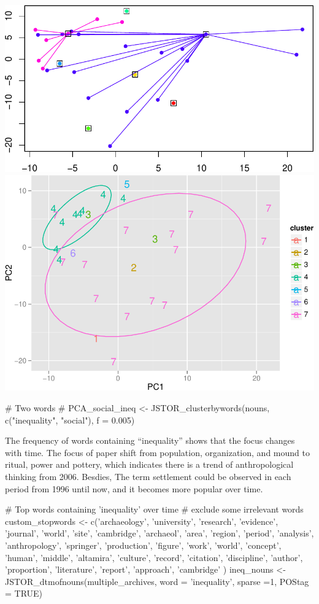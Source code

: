 \documentclass[10pt]{article}
\newenvironment{CodeChunk}{}{}
\begin{document}
\begin{CodeChunk}
\begin{CodeChunk}
\includegraphics{509Assignment_files/figure-latex/onegram3-27} 
\includegraphics{509Assignment_files/figure-latex/onegram3-28} \begin{CodeInput}
# Two words
# PCA_social_ineq <- JSTOR_clusterbywords(nouns, c("inequality", "social"), f = 0.005)
\end{CodeInput}
\end{CodeChunk}

The frequency of words containing ``inequality'' shows that the focus
changes with time. The focus of paper shift from population,
organization, and mound to ritual, power and pottery, which indicates
there is a trend of anthropological thinking from 2006. Besdies, The
term settlement could be observed in each period from 1996 until now,
and it becomes more popular over time.

\begin{CodeChunk}
\begin{CodeInput}
# Top words containing 'inequality' over time
# exclude some irrelevant words
custom_stopwords <- c('archaeology', 'university', 'research', 'evidence', 'journal', 'world', 'site', 'cambridge', 'archaeol', 'area', 'region', 'period', 'analysis', 'anthropology', 'springer', 'production', 'figure', 'work', 'world', 'concept', 'human', 'middle', 'altamira', 'culture', 'record', 'citation', 'discipline', 'author', 'proportion', 'literature', 'report', 'approach', 'cambridge' )
ineq_nouns <- JSTOR_dtmofnouns(multiple_archives, word = 'inequality', sparse =1, POStag = TRUE)
\end{CodeInput}
\begin{CodeOutput}


\end{CodeOutput}
\end{CodeChunk}
\end{CodeChunk}
\end{document}

